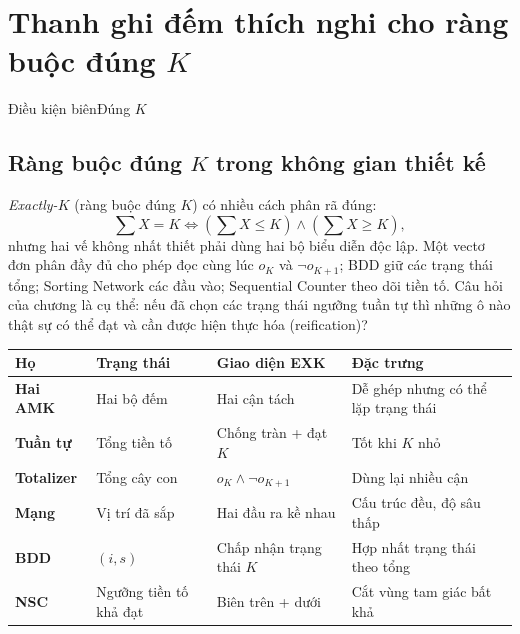 \chapter{Thanh ghi đếm thích nghi cho
  \texorpdfstring{ràng buộc đúng \(K\)}{ràng buộc đúng K}}


  {Điều kiện biên}{Đúng \(K\)}

\section{Ràng buộc đúng \texorpdfstring{\(K\)}{K} trong không gian thiết kế}

\emph{Exactly-\(K\)} (ràng buộc đúng \(K\)) có nhiều cách phân rã đúng:
\[
  \sum X=K
  \iff
  \left(\sum X\le K\right)\land
  \left(\sum X\ge K\right),
\]
nhưng hai vế không nhất thiết phải dùng hai bộ biểu diễn độc lập. Một vectơ đơn
phân đầy đủ cho phép đọc cùng lúc \(o_K\) và \(\neg o_{K+1}\); BDD giữ các
trạng thái tổng; Sorting Network các đầu vào; Sequential Counter theo dõi tiền tố. Câu
hỏi của chương là cụ thể: nếu đã chọn các trạng thái ngưỡng tuần tự thì những
ô nào thật sự có thể đạt và cần được hiện thực hóa (reification)?

\begin{center}
\label{tab:exactly-k-designs}
\begin{tabularx}{\textwidth}{@{}>{\bfseries\sffamily}p{}YYY@{}}
\toprule
Họ & Trạng thái & Giao diện EXK & Đặc trưng\\
\midrule
Hai AMK & Hai bộ đếm & Hai cận tách & Dễ ghép nhưng có thể lặp trạng thái\\
Tuần tự & Tổng tiền tố & Chống tràn + đạt \(K\) & Tốt khi \(K\) nhỏ\\
Totalizer & Tổng cây con & \(o_K\land\neg o_{K+1}\) & Dùng lại nhiều cận\\
Mạng & Vị trí đã sắp & Hai đầu ra kề nhau & Cấu trúc đều, độ sâu thấp\\
BDD & \((i,s)\) & Chấp nhận trạng thái \(K\) & Hợp nhất trạng thái theo tổng\\
NSC & Ngưỡng tiền tố khả đạt & Biên trên + dưới & Cắt vùng tam giác bất khả\\
\bottomrule
\end{tabularx}
\end{center}

